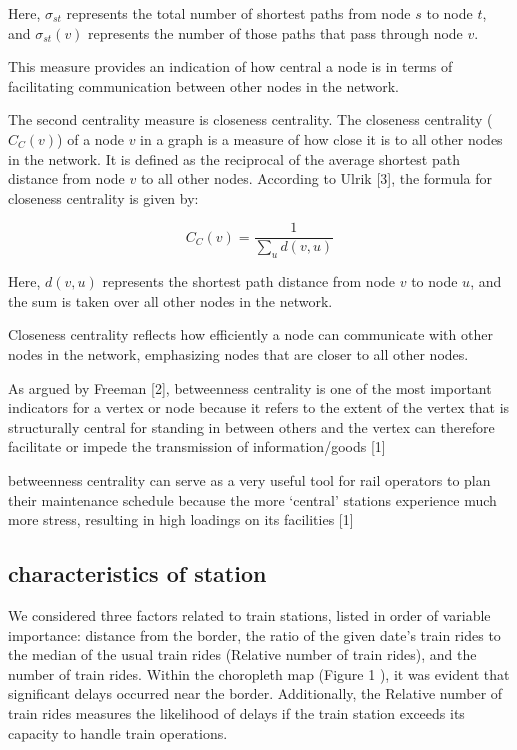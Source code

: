 \documentclass{article}
\theoremstyle{plain}
\theoremstyle{definition}
\theoremstyle{remark}
\begin{document}
Here, $\sigma_{st}$ represents the total number of shortest paths from node $s$ to node $t$, and $\sigma_{st}(v)$ represents the number of those paths that pass through node $v$.

This measure provides an indication of how central a node is in terms of facilitating communication between other nodes in the network.

The second centrality measure is closeness centrality. The closeness centrality ($C_C(v)$) of a node $v$ in a graph is a measure of how close it is to all other nodes in the network. It is defined as the reciprocal of the average shortest path distance from node $v$ to all other nodes. According to Ulrik [3], the formula for closeness centrality is given by:

\begin{equation}
C_C(v) = \frac{1}{\sum_{u} d(v, u)}
\end{equation}

Here, $d(v, u)$ represents the shortest path distance from node $v$ to node $u$, and the sum is taken over all other nodes in the network.

Closeness centrality reflects how efficiently a node can communicate with other nodes in the network, emphasizing nodes that are closer to all other nodes.




As argued by Freeman [2], betweenness centrality is one of the most important indicators for a vertex or node because it refers to the extent of the vertex that is structurally central for standing in between others and the vertex can therefore facilitate or impede the transmission of information/goods [1]

betweenness centrality can serve as a very useful tool for rail operators to plan their maintenance schedule because the more ‘central’ stations experience much more stress, resulting in high loadings on its facilities [1]

\subsection{{characteristics of station}}

We considered three factors related to train stations, listed in order of variable importance: distance from the border, the ratio of the given date's train rides to the median of the usual train rides (Relative number of train rides), and the number of train rides. Within the choropleth map (Figure 1 
), it was evident that significant delays occurred near the border. Additionally, the Relative number of train rides measures the likelihood of delays if the train station exceeds its capacity to handle train operations.
\end{document}
